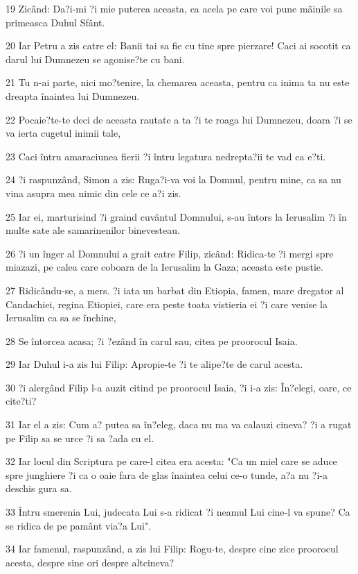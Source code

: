 \par 19 Zicând: Da?i-mi ?i mie puterea aceasta, ca acela pe care voi pune mâinile sa primeasca Duhul Sfânt.
\par 20 Iar Petru a zis catre el: Banii tai sa fie cu tine spre pierzare! Caci ai socotit ca darul lui Dumnezeu se agonise?te cu bani.
\par 21 Tu n-ai parte, nici mo?tenire, la chemarea aceasta, pentru ca inima ta nu este dreapta înaintea lui Dumnezeu.
\par 22 Pocaie?te-te deci de aceasta rautate a ta ?i te roaga lui Dumnezeu, doara ?i se va ierta cugetul inimii tale,
\par 23 Caci întru amaraciunea fierii ?i întru legatura nedrepta?ii te vad ca e?ti.
\par 24 ?i raspunzând, Simon a zis: Ruga?i-va voi la Domnul, pentru mine, ca sa nu vina asupra mea nimic din cele ce a?i zis.
\par 25 Iar ei, marturisind ?i graind cuvântul Domnului, s-au întors la Ierusalim ?i în multe sate ale samarinenilor binevesteau.
\par 26 ?i un înger al Domnului a grait catre Filip, zicând: Ridica-te ?i mergi spre miazazi, pe calea care coboara de la Ierusalim la Gaza; aceasta este pustie.
\par 27 Ridicându-se, a mers. ?i iata un barbat din Etiopia, famen, mare dregator al Candachiei, regina Etiopiei, care era peste toata vistieria ei ?i care venise la Ierusalim ca sa se închine,
\par 28 Se întorcea acasa; ?i ?ezând în carul sau, citea pe proorocul Isaia.
\par 29 Iar Duhul i-a zis lui Filip: Apropie-te ?i te alipe?te de carul acesta.
\par 30 ?i alergând Filip l-a auzit citind pe proorocul Isaia, ?i i-a zis: În?elegi, oare, ce cite?ti?
\par 31 Iar el a zis: Cum a? putea sa în?eleg, daca nu ma va calauzi cineva? ?i a rugat pe Filip sa se urce ?i sa ?ada cu el.
\par 32 Iar locul din Scriptura pe care-l citea era acesta: "Ca un miel care se aduce spre junghiere ?i ca o oaie fara de glas înaintea celui ce-o tunde, a?a nu ?i-a deschis gura sa.
\par 33 Întru smerenia Lui, judecata Lui s-a ridicat ?i neamul Lui cine-l va spune? Ca se ridica de pe pamânt via?a Lui".
\par 34 Iar famenul, raspunzând, a zis lui Filip: Rogu-te, despre cine zice proorocul acesta, despre sine ori despre altcineva?

